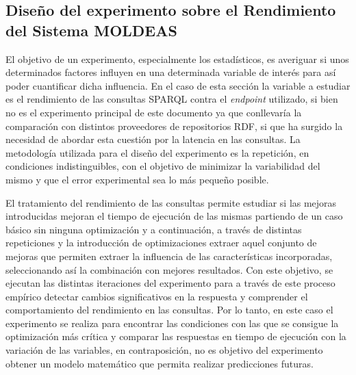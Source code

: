 \subsection{Diseño del experimento sobre el Rendimiento del Sistema MOLDEAS}
El objetivo de un experimento, especialmente los estadísticos, es averiguar si unos determinados 
factores influyen en una determinada variable de interés para así poder cuantificar dicha influencia. En el caso 
de esta sección la variable a estudiar es el rendimiento de las consultas \gls{SPARQL} contra el \textit{endpoint} utilizado, si bien 
no es el experimento principal de este documento ya que conllevaría la comparación con distintos proveedores de 
repositorios \gls{RDF}, si que ha surgido la necesidad de abordar esta cuestión por la latencia en las consultas. La metodología utilizada 
para el diseño del experimento es la repetición, en condiciones indistinguibles, con el objetivo de minimizar la variabilidad 
del mismo y que el error experimental sea lo más pequeño posible.

El tratamiento del rendimiento de las consultas permite estudiar si las mejoras introducidas mejoran 
el tiempo de ejecución de las mismas partiendo de un caso básico sin ninguna optimización y a continuación, a 
través de distintas repeticiones y la introducción de optimizaciones extraer aquel conjunto de mejoras que 
permiten extraer la influencia de las características incorporadas, seleccionando así la combinación con mejores resultados. Con este objetivo, 
se ejecutan las distintas iteraciones del experimento para a través de este proceso empírico detectar 
cambios significativos en la respuesta y comprender el comportamiento del rendimiento en las consultas. Por lo tanto, 
en este caso el experimento se realiza para encontrar las condiciones con las que se consigue la optimización 
más crítica y comparar las respuestas en tiempo de ejecución con la variación de las variables, en contraposición, 
no es objetivo del experimento obtener un modelo matemático que permita realizar predicciones futuras. 

